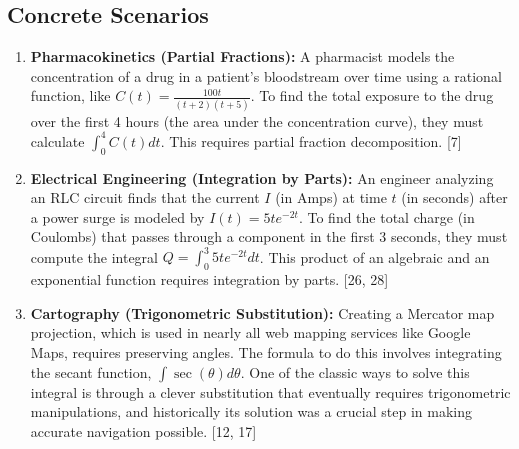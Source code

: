 \documentclass{article}
\begin{document}
\subsection{Concrete Scenarios}
\begin{enumerate}
    \item \textbf{Pharmacokinetics (Partial Fractions):} A pharmacist models the concentration of a drug in a patient's bloodstream over time using a rational function, like $C(t) = \frac{100t}{(t+2)(t+5)}$. To find the total exposure to the drug over the first 4 hours (the area under the concentration curve), they must calculate $\int_0^4 C(t) dt$. This requires partial fraction decomposition. [7]
    \item \textbf{Electrical Engineering (Integration by Parts):} An engineer analyzing an RLC circuit finds that the current $I$ (in Amps) at time $t$ (in seconds) after a power surge is modeled by $I(t) = 5t e^{-2t}$. To find the total charge (in Coulombs) that passes through a component in the first 3 seconds, they must compute the integral $Q = \int_0^3 5t e^{-2t} dt$. This product of an algebraic and an exponential function requires integration by parts. [26, 28]
    \item \textbf{Cartography (Trigonometric Substitution):} Creating a Mercator map projection, which is used in nearly all web mapping services like Google Maps, requires preserving angles. The formula to do this involves integrating the secant function, $\int \sec(\theta) d\theta$. One of the classic ways to solve this integral is through a clever substitution that eventually requires trigonometric manipulations, and historically its solution was a crucial step in making accurate navigation possible. [12, 17]
\end{enumerate}
\end{document}

